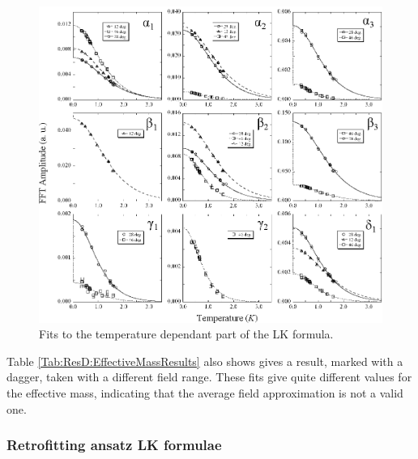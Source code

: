 \begin{figure}[htbp]
    \begin{center}
        \includegraphics[scale=0.9]{Chapter-dHvABaFe2P2/Figures/Mass/SimpleLKFits/SimpleLKFits}
        \caption{Fits to the temperature dependant part of the \ac{LK} formula. }
        \label{Fig:ResD:SimpleLKFits}
    \end{center}
\end{figure}
Table \ref{Tab:ResD:EffectiveMassResults} also shows gives a result, marked with a dagger, taken with a different field range. These fits give quite different values for the effective mass, indicating that the average field approximation is not a valid one.

\subsubsection{Retrofitting ansatz \ac{LK} formulae}

